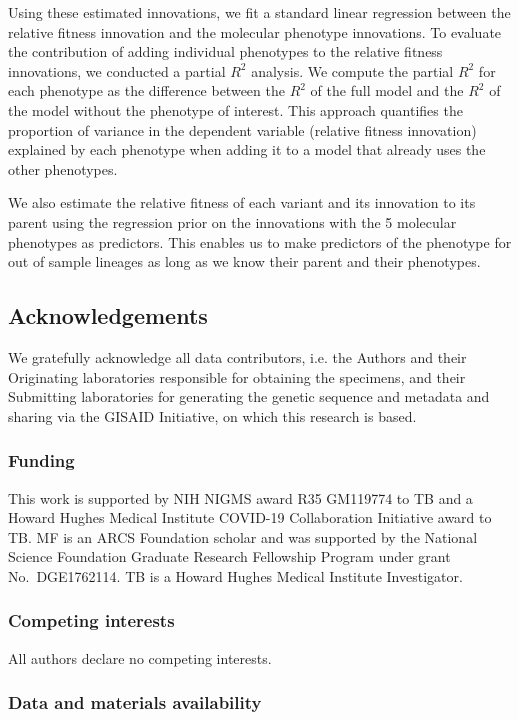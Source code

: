 Using these estimated innovations, we fit a standard linear regression between the relative fitness innovation and the molecular phenotype innovations.
To evaluate the contribution of adding individual phenotypes to the relative fitness innovations, we conducted a partial $R^2$ analysis.
We compute the partial $R^2$ for each phenotype as the difference between the $R^2$ of the full model and the $R^2$ of the model without the phenotype of interest.
This approach quantifies the proportion of variance in the dependent variable (relative fitness innovation) explained by each phenotype when adding it to a model that already uses the other phenotypes.

We also estimate the relative fitness of each variant and its innovation to its parent using the regression prior on the innovations with the 5 molecular phenotypes as predictors.
This enables us to make predictors of the phenotype for out of sample lineages as long as we know their parent and their phenotypes.

\subsection*{Acknowledgements}

We gratefully acknowledge all data contributors, i.e. the Authors and their Originating laboratories responsible for obtaining the specimens, and their Submitting laboratories for generating the genetic sequence and metadata and sharing via the GISAID Initiative, on which this research is based.

\subsubsection*{Funding}

This work is supported by NIH NIGMS award R35 GM119774 to TB and a Howard Hughes Medical Institute COVID-19 Collaboration Initiative award to TB.
MF is an ARCS Foundation scholar and was supported by the National Science Foundation Graduate Research Fellowship Program under grant No.\ DGE1762114.
TB is a Howard Hughes Medical Institute Investigator.

\subsubsection*{Competing interests}

All authors declare no competing interests.

\subsubsection*{Data and materials availability}

